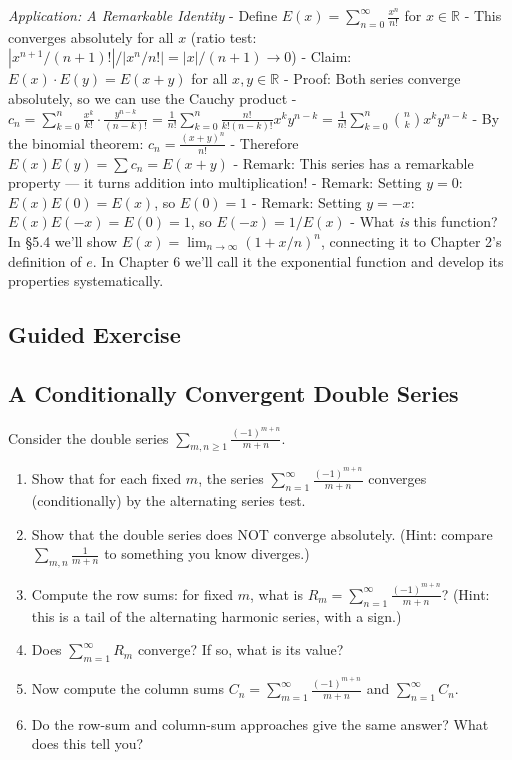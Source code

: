 \documentclass[
  10pt,
  letterpaper,
]{scrbook}
\begin{document}
\emph{Application: A Remarkable Identity} - Define
\(E(x) = \sum_{n=0}^{\infty} \frac{x^n}{n!}\) for \(x \in \mathbb{R}\) -
This converges absolutely for all \(x\) (ratio test:
\(|x^{n+1}/(n+1)!| / |x^n/n!| = |x|/(n+1) \to 0\)) - Claim:
\(E(x) \cdot E(y) = E(x + y)\) for all \(x, y \in \mathbb{R}\) - Proof:
Both series converge absolutely, so we can use the Cauchy product -
\(c_n = \sum_{k=0}^{n} \frac{x^k}{k!} \cdot \frac{y^{n-k}}{(n-k)!} = \frac{1}{n!} \sum_{k=0}^{n} \frac{n!}{k!(n-k)!} x^k y^{n-k} = \frac{1}{n!} \sum_{k=0}^{n} \binom{n}{k} x^k y^{n-k}\)
- By the binomial theorem: \(c_n = \frac{(x+y)^n}{n!}\) - Therefore
\(E(x) E(y) = \sum c_n = E(x+y)\) - Remark: This series has a remarkable
property --- it turns addition into multiplication! - Remark: Setting
\(y = 0\): \(E(x) E(0) = E(x)\), so \(E(0) = 1\) - Remark: Setting
\(y = -x\): \(E(x) E(-x) = E(0) = 1\), so \(E(-x) = 1/E(x)\) - What
\emph{is} this function? In §5.4 we'll show
\(E(x) = \lim_{n \to \infty} (1 + x/n)^n\), connecting it to Chapter 2's
definition of \(e\). In Chapter 6 we'll call it the exponential function
and develop its properties systematically.

\subsection{Guided Exercise}\label{guided-exercise-9}

\subsection{A Conditionally Convergent Double
Series}\label{a-conditionally-convergent-double-series}

Consider the double series \(\sum_{m,n \geq 1} \frac{(-1)^{m+n}}{m+n}\).

\begin{enumerate}
\def\labelenumi{(\alph{enumi})}
\item
  Show that for each fixed \(m\), the series
  \(\sum_{n=1}^{\infty} \frac{(-1)^{m+n}}{m+n}\) converges
  (conditionally) by the alternating series test.
\item
  Show that the double series does NOT converge absolutely. (Hint:
  compare \(\sum_{m,n} \frac{1}{m+n}\) to something you know diverges.)
\item
  Compute the row sums: for fixed \(m\), what is
  \(R_m = \sum_{n=1}^{\infty} \frac{(-1)^{m+n}}{m+n}\)? (Hint: this is a
  tail of the alternating harmonic series, with a sign.)
\item
  Does \(\sum_{m=1}^{\infty} R_m\) converge? If so, what is its value?
\item
  Now compute the column sums
  \(C_n = \sum_{m=1}^{\infty} \frac{(-1)^{m+n}}{m+n}\) and
  \(\sum_{n=1}^{\infty} C_n\).
\item
  Do the row-sum and column-sum approaches give the same answer? What
  does this tell you?
\end{enumerate}
\end{document}
